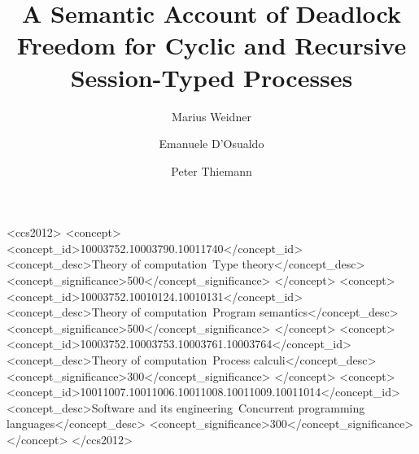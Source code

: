 \documentclass[acmsmall,screen,review,anonymous,nonacm]{acmart}
\begin{document}
\title{A Semantic Account of Deadlock Freedom for Cyclic and Recursive Session-Typed Processes}


\author{Marius Weidner}

\author{Emanuele D'Osualdo}

\author{Peter Thiemann}

\begin{CCSXML}
  <ccs2012>
  <concept>
  <concept_id>10003752.10003790.10011740</concept_id>
  <concept_desc>Theory of computation~Type theory</concept_desc>
  <concept_significance>500</concept_significance>
  </concept>
  <concept>
  <concept_id>10003752.10010124.10010131</concept_id>
  <concept_desc>Theory of computation~Program semantics</concept_desc>
  <concept_significance>500</concept_significance>
  </concept>
  <concept>
  <concept_id>10003752.10003753.10003761.10003764</concept_id>
  <concept_desc>Theory of computation~Process calculi</concept_desc>
  <concept_significance>300</concept_significance>
  </concept>
  <concept>
  <concept_id>10011007.10011006.10011008.10011009.10011014</concept_id>
  <concept_desc>Software and its engineering~Concurrent programming languages</concept_desc>
  <concept_significance>300</concept_significance>
  </concept>
  </ccs2012>
\end{CCSXML}

\maketitle


\end{document}
